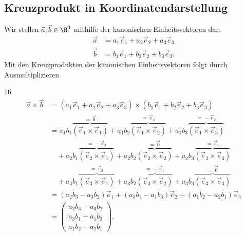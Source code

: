 \subsection{Kreuzprodukt in Koordinatendarstellung}
\label{subsec:vector_algebra_cross_product_coordinates}

Wir stellen $\vec a,\vec b\in\R^3$ mithilfe der kanonischen Einheitsvektoren
dar:
\begin{align*}
    \vec a&=a_1\vec e_1+a_2\vec e_2+a_3\vec e_3 \\
    \vec b&=b_1\vec e_1+b_2\vec e_2+b_3\vec e_3.
\end{align*}
%
Mit den Kreuzprodukten der kanonischen Einheitsvektoren folgt durch
Ausmultiplizieren
\begin{ClozeArea}[34]{16}
  \[
    \begin{aligned}
      \vec a\times\vec b
      &=(a_1\vec e_1+a_2\vec e_2+a_3\vec e_3)
        \times(b_1\vec e_1+b_2\vec e_2+b_3\vec e_3)\\[1.5em]
      &=a_1b_1\overbrace{(\vec e_1\times\vec e_1)}^{=\,\vec 0}
        +a_1b_2\overbrace{(\vec e_1\times\vec e_2)}^{=\,\vec e_3}
        +a_1b_3\overbrace{(\vec e_1\times\vec e_3)}^{=\,-\vec e_2}
        \\[0.9em]
      &\quad
        +a_2b_1\overbrace{(\vec e_2\times\vec e_1)}^{=\,-\vec e_3}
        +a_2b_2\overbrace{(\vec e_2\times\vec e_2)}^{=\,\vec 0}
        +a_2b_3\overbrace{(\vec e_2\times\vec e_3)}^{=\,\vec e_1}
        \\[0.9em]
      &\quad
        +a_3b_1\overbrace{(\vec e_3\times\vec e_1)}^{=\,\vec e_2}
        +a_3b_2\overbrace{(\vec e_3\times\vec e_2)}^{=\,-\vec e_1}
        +a_3b_3\overbrace{(\vec e_3\times\vec e_3)}^{=\,\vec 0}
        \\[1.3em]
      &=(a_2b_3-a_3b_2)\vec e_1
        +(a_3b_1-a_1b_3)\vec e_2
        +(a_1b_2-a_2b_1)\vec e_3\\[1em]
      &=\begin{pmatrix}
          a_2b_3-a_3b_2\\
          a_3b_1-a_1b_3\\
          a_1b_2-a_2b_1
        \end{pmatrix}.
    \end{aligned}
  \]
\end{ClozeArea}

